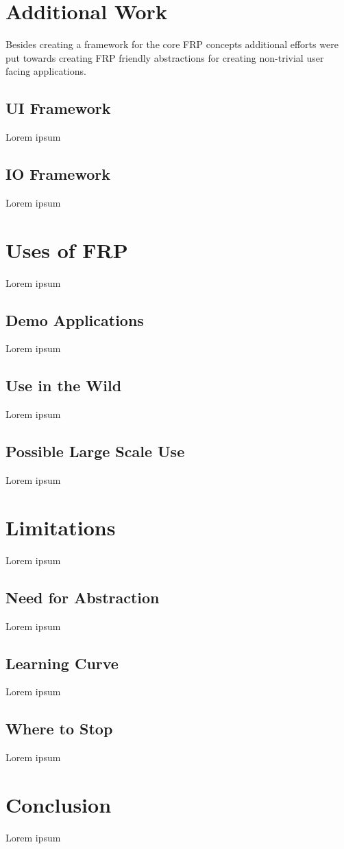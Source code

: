 \documentclass[12pt]{article}
\begin{document}
  \section{Additional Work}
    Besides creating a framework for the core FRP concepts additional efforts
    were put towards creating FRP friendly abstractions for creating non-trivial user facing
    applications.
    
    \subsection{UI Framework}
    Lorem ipsum
    
    \subsection{IO Framework}
    Lorem ipsum
    
  \section{Uses of FRP}
  Lorem ipsum
  
    \subsection{Demo Applications}
    Lorem ipsum
    
    \subsection{Use in the Wild}
    Lorem ipsum
    
    \subsection{Possible Large Scale Use}
    Lorem ipsum
    
  \section{Limitations}
    Lorem ipsum
    
    \subsection{Need for Abstraction}
    Lorem ipsum
    
    \subsection{Learning Curve}
    Lorem ipsum
    
    \subsection{Where to Stop}
    Lorem ipsum
    
  \section{Conclusion}
  Lorem ipsum
  
\end{document}
